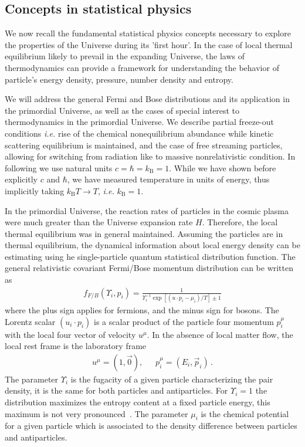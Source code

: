 \subsection{Concepts in statistical physics} \label{sec:statphys}
We now recall the fundamental statistical physics concepts necessary to explore the properties of the Universe during its 'first hour'. In the case of local thermal equilibrium likely to prevail in the expanding Universe, the laws of thermodynamics can provide a framework for understanding the behavior of particle's energy density, pressure, number density and entropy.

We will address the general Fermi and Bose distributions and its application in the primordial Universe, as well as the cases of special interest to thermodynamics in the primordial Universe. We describe partial freeze-out conditions {\it i.e.\/} rise of the chemical nonequilibrium abundance while kinetic scattering equilibrium is maintained, and the case of free streaming particles, allowing for switching from radiation like to massive nonrelativistic condition. In following we use natural units $c=\hbar=k_\mathrm{B}=1$. While we have shown before explicitly $c$ and $\hbar$, we have measured temperature in units of energy, thus implicitly taking $k_\mathrm{B}T\to T$, {\it i.e.\/} $k_\mathrm{B}=1$.

In the primordial Universe, the reaction rates of particles in the cosmic plasma were much greater than the Universe expansion rate $H$. Therefore, the local thermal equilibrium was in general maintained. Assuming the particles are in thermal equilibrium, the dynamical information about local energy density can be estimating using he single-particle quantum statistical distribution function. The general relativistic covariant Fermi/Bose momentum distribution can be written as
\begin{align}
f_{F/B}(\Upsilon_i,p_i)=\frac{1}{\Upsilon^{-1}_i\exp{\left[(u\cdot p_i-\mu_i)/T\right]}\pm1}
\end{align}
where the plus sign applies for fermions, and the minus sign for bosons. The Lorentz scalar $(u_i\cdot p_i)$ is a scalar product of the particle four momentum $p^\mu_i$ with the local four vector of velocity $u^\mu$. In the absence of local matter flow, the local rest frame is the laboratory frame 
\begin{align}
u^\mu=\left(1,\vec{0}\right),\,\,\,\,\,\,\,\,\, p^\mu_i=\left(E_i,\vec{p}_i\right)\,.
\end{align} 
The parameter $\Upsilon_i$ is the fugacity of a given particle characterizing the pair density, it is the same for both particles and antiparticles. For $\Upsilon_i=1$ the distribution maximizes the entropy content at a fixed particle energy, this maximum is not very pronounced~\cite{Letessier:1993qa}. The parameter $\mu_i$ is the chemical potential for a given particle which is associated to the density difference between particles and antiparticles.

